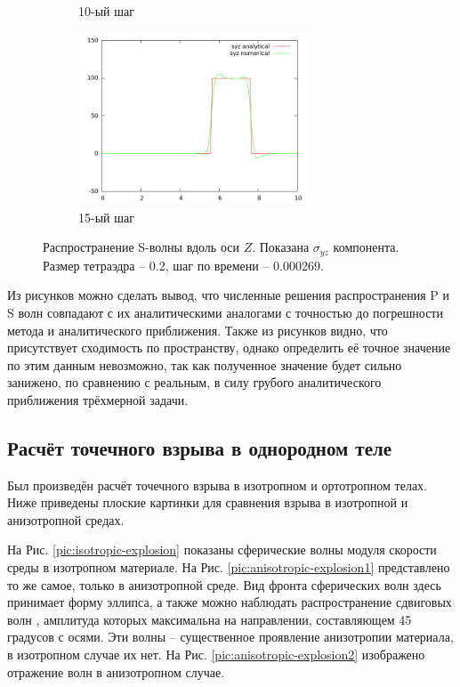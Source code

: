 \begin{figure}[H]
\begin{subfigure}[b]{0.5\textwidth}
\caption{10-ый шаг}
\end{subfigure}
\begin{subfigure}[b]{0.5\textwidth}
\centering
\includegraphics[width=0.75\textwidth]{png/veryfication/0.2/s-wave-along-z15.png}
\caption{15-ый шаг}
\end{subfigure}
\caption{Распространение S-волны вдоль оси $Z$. Показана $\sigma_{yz}$ компонента. Размер тетраэдра -- 0.2, шаг по времени -- 0.000269. }
\label{pic:s_wave_along_z2}
\end{figure}

	Из рисунков можно сделать вывод, что численные решения распространения P и S волн совпадают с их аналитическими аналогами с точностью до погрешности метода и аналитического приближения.
	Также из рисунков видно, что присутствует сходимость по пространству, однако определить её точное значение по этим данным невозможно, так как полученное значение будет сильно занижено, по сравнению с реальным, в силу грубого аналитического приближения трёхмерной задачи.

\subsection{Расчёт точечного взрыва в однородном теле}

	Был произведён расчёт точечного взрыва в изотропном и ортотропном телах.
	Ниже приведены плоские картинки для сравнения взрыва в изотропной и анизотропной средах.
	
	На Рис. \ref{pic:isotropic-explosion} показаны сферические волны модуля скорости среды в изотропном материале.
	На Рис. \ref{pic:anisotropic-explosion1} представлено то же самое, только в анизотропной среде.
	Вид фронта сферических волн здесь принимает форму эллипса, а также можно наблюдать распространение сдвиговых волн \cite{ogurtsov}, амплитуда которых максимальна на направлении, составляющем 45 градусов с осями.
	Эти волны -- существенное проявление анизотропии материала, в изотропном случае их нет.
	На Рис. \ref{pic:anisotropic-explosion2} изображено отражение волн в анизотропном случае.
	
